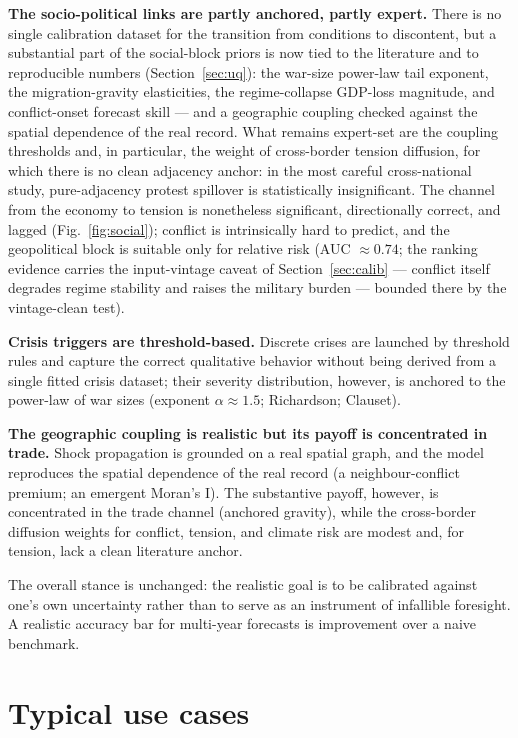 \documentclass[a4paper,fleqn]{cas-sc}
\begin{document}
\textbf{The socio-political links are partly anchored, partly expert.} There is no single calibration
dataset for the transition from conditions to discontent, but a substantial part of the social-block
priors is now tied to the literature and to reproducible numbers (Section~\ref{sec:uq}): the war-size
power-law tail exponent, the migration-gravity elasticities, the regime-collapse GDP-loss magnitude,
and conflict-onset forecast skill --- and a geographic coupling checked against the spatial dependence
of the real record. What remains expert-set are the coupling thresholds and, in particular, the weight
of cross-border tension diffusion, for which there is no clean adjacency anchor: in the most careful
cross-national study, pure-adjacency protest spillover is statistically insignificant. The channel from
the economy to tension is nonetheless significant, directionally correct, and lagged
(Fig.~\ref{fig:social}); conflict is intrinsically hard to predict, and the geopolitical block is
suitable only for relative risk (AUC ${\approx}0.74$; the ranking evidence carries the
input-vintage caveat of Section~\ref{sec:calib} --- conflict itself degrades regime
stability and raises the military burden --- bounded there by the vintage-clean test).

\textbf{Crisis triggers are threshold-based.} Discrete crises are launched by threshold rules and
capture the correct qualitative behavior without being derived from a single fitted crisis dataset;
their severity distribution, however, is anchored to the power-law of war sizes (exponent
${\alpha}{\approx}1.5$; Richardson; Clauset).

\textbf{The geographic coupling is realistic but its payoff is concentrated in trade.} Shock
propagation is grounded on a real spatial graph, and the model reproduces the spatial dependence of the
real record (a neighbour-conflict premium; an emergent Moran's I). The substantive payoff, however, is
concentrated in the trade channel (anchored gravity), while the cross-border diffusion weights for
conflict, tension, and climate risk are modest and, for tension, lack a clean literature anchor.

The overall stance is unchanged: the realistic goal is to be calibrated against one's own
uncertainty rather than to serve as an instrument of infallible foresight. A realistic accuracy bar
for multi-year forecasts is improvement over a naive benchmark.

\section{Typical use cases}
\label{sec:scenarios}
\end{document}
